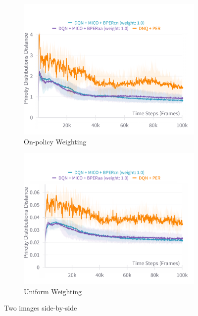 \begin{figure}[h]
    \centering
    \begin{subfigure}{0.45\textwidth}
    \includegraphics[width=\linewidth]{Results/grid_world/on_policy_weighting_outdated_priorities.png}
        \caption{On-policy Weighting}
        \label{fig:priority_dist_distance_on_policy_weighting}
    \end{subfigure}
    \hfill
    \begin{subfigure}{0.45\textwidth}
        \includegraphics[width=\linewidth]{Results/grid_world/uniform_weighting_outdated_priorities.png}
        \caption{Uniform Weighting}
        \label{fig:priority_dist_distance_uniform_weighting}
    \end{subfigure}
    \caption{Two images side-by-side}
    \label{fig:priority_dist_distance}
\end{figure}

